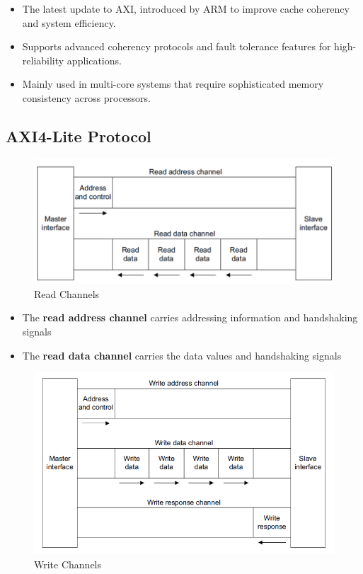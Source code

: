 \begin{enumerate}
  \begin{itemize}
  \tightlist
  \item
    The latest update to AXI, introduced by ARM to improve cache
    coherency and system efficiency.
  \item
    Supports advanced coherency protocols and fault tolerance features
    for high-reliability applications.
  \item
    Mainly used in multi-core systems that require sophisticated memory
    consistency across processors.
  \end{itemize}
\end{enumerate}

\hypertarget{axi4-lite-protocol}{%
\subsection{AXI4-Lite Protocol}\label{axi4-lite-protocol}}

\begin{figure}
\centering
\includegraphics{images/read_channels_diagram.png}
\caption{Read Channels}
\end{figure}

\begin{itemize}
\tightlist
\item
  The \textbf{read address channel} carries addressing information and
  handshaking signals
\item
  The \textbf{read data channel} carries the data values and handshaking
  signals
\end{itemize}

\begin{figure}
\centering
\includegraphics{images/write_channels_diagram.png}
\caption{Write Channels}
\end{figure}

